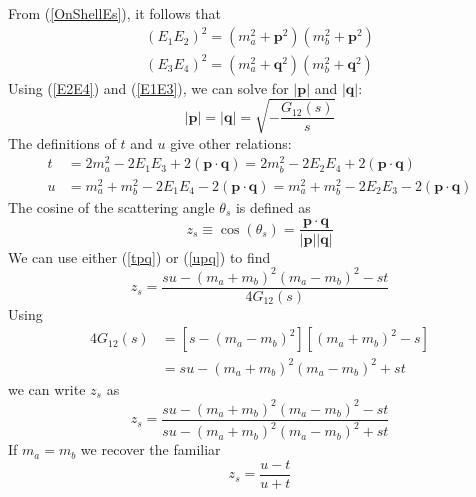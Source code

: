 From (\ref{OnShellEs}), it follows that
\begin{equation}
\begin{split}
	(E_{1} E_{2})^{2} = (m_{a}^{2} + \mathbf{p}^{2})(m_{b}^{2} + \mathbf{p}^{2}) \\
	(E_{3} E_{4})^{2} = (m_{a}^{2} + \mathbf{q}^{2})(m_{b}^{2} + \mathbf{q}^{2})
\end{split}
\end{equation}
Using (\ref{E2E4}) and (\ref{E1E3}), we can solve for $|\mathbf{p}|$ and $|\mathbf{q}|$:
\begin{equation}
	|\mathbf{p}| = |\mathbf{q}| = \sqrt{-\frac{G_{12}(s)}{s}} \label{magpq}
\end{equation}
The definitions of $t$ and $u$ give other relations:
\begin{align}
	t &= 2m_{a}^{2} - 2 E_{1} E_{3} + 2 (\mathbf{p} \cdot \mathbf{q}) = 2m_{b}^{2} - 2 E_{2} E_{4} + 2 (\mathbf{p} \cdot \mathbf{q}) \label{tpq} \\
	u &= m_{a}^{2} + m_{b}^{2} - 2 E_{1} E_{4} - 2 (\mathbf{p} \cdot \mathbf{q}) = m_{a}^{2} + m_{b}^{2} - 2 E_{2} E_{3} - 2 (\mathbf{p} \cdot \mathbf{q}) \label{upq}
\end{align}
The cosine of the scattering angle $\theta_{s}$ is defined as
\begin{equation}
	z_{s} \equiv \cos{(\theta_{s})} = \frac{\mathbf{p} \cdot \mathbf{q}}{|\mathbf{p}| |\mathbf{q}|}
\end{equation}
We can use either (\ref{tpq}) or (\ref{upq}) to find
\begin{equation}
	z_{s} = \frac{s u - (m_{a} + m_{b})^{2} (m_{a} - m_{b})^{2} - s t}{4 G_{12}(s)}
\end{equation}
Using
\begin{align}
	4 G_{12}(s) &= [s - (m_{a} - m_{b})^{2}] [(m_{a} + m_{b})^{2} - s] \nonumber \\
	&= su - (m_{a} + m_{b})^{2} (m_{a} - m_{b})^{2} + st
\end{align}
we can write $z_{s}$ as
\begin{equation}
	z_{s} = \frac{s u - (m_{a} + m_{b})^{2} (m_{a} - m_{b})^{2} - s t}{su - (m_{a} + m_{b})^{2} (m_{a} - m_{b})^{2} + st} \label{zFrac}
\end{equation}
If $m_{a} = m_{b}$ we recover the familiar
\begin{equation}
	z_{s} = \frac{u - t}{u + t}
\end{equation}
